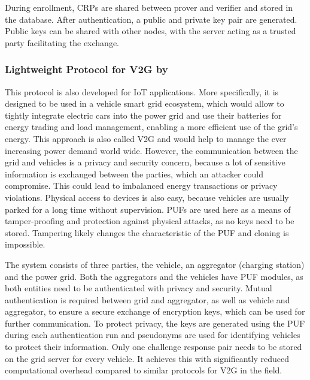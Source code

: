 During enrollment, CRPs are shared between prover and verifier and stored in the database.
After authentication, a public and private key pair are generated. Public keys can be shared
with other nodes, with the server acting as a trusted party facilitating the exchange. \cite[][p. 4]{Braeken2018}


\subsubsection{Lightweight Protocol for V2G by \citeauthor*{Bansal2020}}
\label{sec:review_protocol_5}

This protocol is also developed for IoT applications. More specifically, it is designed to be used
in a vehicle smart grid ecosystem, which would allow to tightly integrate electric cars into the power grid
and use their batteries for energy trading and load management, enabling a more efficient use of the grid's
energy. This approach is also called \ac{V2G} and would help to manage the ever increasing power demand world
wide. However, the communication between the grid and vehicles is a privacy and security concern, because
a lot of sensitive information is exchanged between the parties, which an attacker could compromise. This
could lead to imbalanced energy transactions or privacy violations. Physical access to devices is also
easy, because vehicles are usually parked for a long time without supervision.
PUFs are used here as a means of tamper-proofing and protection against physical attacks, as no keys
need to be stored. Tampering likely changes the characteristic of the PUF and cloning is impossible. \cite[][p. 7234]{Bansal2020}

The system consists of three parties, the vehicle, an aggregator (charging station) and the power grid.
Both the aggregators and the vehicles have PUF modules, as both entities need to be authenticated
with privacy and security.
Mutual authentication is required between grid and aggregator, as well as vehicle and aggregator, to ensure
a secure exchange of encryption keys, which can be used for further communication.
To protect privacy, the keys are generated using the PUF during each authentication run and pseudonyms are used
for identifying vehicles to protect their information. \cite[][p. 7234f]{Bansal2020}
Only one challenge response pair needs to be stored on the grid server for every vehicle.
It achieves this with significantly reduced computational overhead compared to similar protocols for V2G in the field. \cite[][p. 7244]{Bansal2020}

